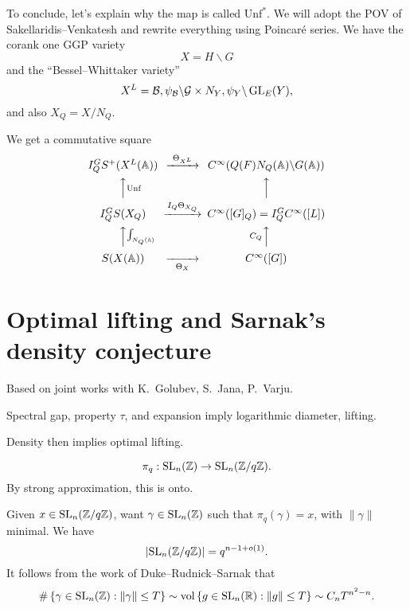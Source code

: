 \documentclass[reqno]{amsart} 
\begin{document}
To conclude, let's explain why the map is called $\mathrm{Unf}^\ast$.  We will adopt the POV of Sakellaridis--Venkatesh and rewrite everything using Poincar{\'e} series.  We have the corank one GGP variety
\begin{equation*}
X = H \backslash G
\end{equation*}
and the ``Bessel--Whittaker variety''
\begin{equation*}
  X^L = \mathcal{B}, \psi_{\mathcal{B} } \backslash \mathcal{G} \times N_Y , \psi_Y \backslash \operatorname{GL}_E (Y),
\end{equation*}
and also $X_Q = X / N_Q$.

We get a commutative square
\begin{equation*}
  \begin{CD}
    I_Q^G S^+(X^L(\mathbb{A})) @> \Theta_{X^L} >> C^\infty (Q(F) N_Q(\mathbb{A}) \backslash G(\mathbb{A})) \\
    @AA \mathrm{Unf} A @AAA \\
    I_Q^G S(X_Q) @> I_Q \Theta_{X_Q}>> C^\infty ([G]_Q ) = I_Q^G C^\infty ([L])\\
    @A A \int_{N_Q(\mathbb{A})} A  @A C_Q A A \\
    S (X(\mathbb{A})) @>> \Theta_X> C^\infty ([G])\\
  \end{CD}
\end{equation*}

\section{Optimal lifting and Sarnak's density conjecture}
Based on joint works with K.\ Golubev, S.\ Jana, P.\ Varju.

Spectral gap, property $\tau$, and expansion imply logarithmic diameter, lifting.

Density then implies optimal lifting.

\begin{equation*}
\pi_q : \operatorname{SL}_n (\mathbb{Z} ) \rightarrow \operatorname{SL}_n (\mathbb{Z} / q \mathbb{Z}).
\end{equation*}
By strong approximation, this is onto.

Given $x \in \operatorname{SL}_n (\mathbb{Z} / q \mathbb{Z})$, want $\gamma \in \operatorname{SL}_n (\mathbb{Z})$ such that $\pi_q (\gamma ) = x$, with $\lVert \gamma  \rVert$ minimal.
We have
\begin{equation*}
\lvert \operatorname{SL}_n (\mathbb{Z} / q \mathbb{Z} ) \rvert = q^{n - 1 + o (1)}.
\end{equation*}
It follows from the work of Duke--Rudnick--Sarnak that
\begin{equation*}
  \# \left\{ \gamma \in \operatorname{SL}_n (\mathbb{Z} ) : \lVert \gamma  \rVert \leq T \right\}
  \sim \operatorname{vol} \left\{ g \in \operatorname{SL}_n (\mathbb{R} ) : \lVert g  \rVert \leq T \right\}
  \sim C_n T^{n^2 - n}.
\end{equation*}
\end{document}
